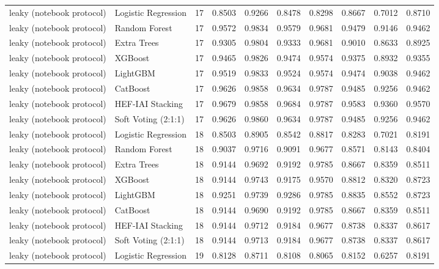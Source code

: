 \begin{tabular}{llrrrrrrrr}
leaky (notebook protocol) & Logistic Regression & 17 & 0.8503 & 0.9266 & 0.8478 & 0.8298 & 0.8667 & 0.7012 & 0.8710 \\
leaky (notebook protocol) & Random Forest & 17 & 0.9572 & 0.9834 & 0.9579 & 0.9681 & 0.9479 & 0.9146 & 0.9462 \\
leaky (notebook protocol) & Extra Trees & 17 & 0.9305 & 0.9804 & 0.9333 & 0.9681 & 0.9010 & 0.8633 & 0.8925 \\
leaky (notebook protocol) & XGBoost & 17 & 0.9465 & 0.9826 & 0.9474 & 0.9574 & 0.9375 & 0.8932 & 0.9355 \\
leaky (notebook protocol) & LightGBM & 17 & 0.9519 & 0.9833 & 0.9524 & 0.9574 & 0.9474 & 0.9038 & 0.9462 \\
leaky (notebook protocol) & CatBoost & 17 & 0.9626 & 0.9858 & 0.9634 & 0.9787 & 0.9485 & 0.9256 & 0.9462 \\
leaky (notebook protocol) & HEF-IAI Stacking & 17 & 0.9679 & 0.9858 & 0.9684 & 0.9787 & 0.9583 & 0.9360 & 0.9570 \\
leaky (notebook protocol) & Soft Voting (2:1:1) & 17 & 0.9626 & 0.9860 & 0.9634 & 0.9787 & 0.9485 & 0.9256 & 0.9462 \\
leaky (notebook protocol) & Logistic Regression & 18 & 0.8503 & 0.8905 & 0.8542 & 0.8817 & 0.8283 & 0.7021 & 0.8191 \\
leaky (notebook protocol) & Random Forest & 18 & 0.9037 & 0.9716 & 0.9091 & 0.9677 & 0.8571 & 0.8143 & 0.8404 \\
leaky (notebook protocol) & Extra Trees & 18 & 0.9144 & 0.9692 & 0.9192 & 0.9785 & 0.8667 & 0.8359 & 0.8511 \\
leaky (notebook protocol) & XGBoost & 18 & 0.9144 & 0.9743 & 0.9175 & 0.9570 & 0.8812 & 0.8320 & 0.8723 \\
leaky (notebook protocol) & LightGBM & 18 & 0.9251 & 0.9739 & 0.9286 & 0.9785 & 0.8835 & 0.8552 & 0.8723 \\
leaky (notebook protocol) & CatBoost & 18 & 0.9144 & 0.9690 & 0.9192 & 0.9785 & 0.8667 & 0.8359 & 0.8511 \\
leaky (notebook protocol) & HEF-IAI Stacking & 18 & 0.9144 & 0.9712 & 0.9184 & 0.9677 & 0.8738 & 0.8337 & 0.8617 \\
leaky (notebook protocol) & Soft Voting (2:1:1) & 18 & 0.9144 & 0.9713 & 0.9184 & 0.9677 & 0.8738 & 0.8337 & 0.8617 \\
leaky (notebook protocol) & Logistic Regression & 19 & 0.8128 & 0.8711 & 0.8108 & 0.8065 & 0.8152 & 0.6257 & 0.8191 \\

\end{tabular}
